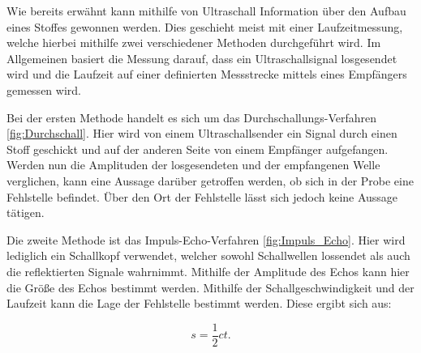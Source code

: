 Wie bereits erwähnt kann mithilfe von Ultraschall Information über
den Aufbau eines Stoffes gewonnen werden. Dies geschieht meist mit einer
Laufzeitmessung, welche hierbei mithilfe zwei verschiedener Methoden durchgeführt
wird. Im Allgemeinen basiert die Messung darauf, dass ein Ultraschallsignal
losgesendet wird und die Laufzeit auf einer definierten Messstrecke mittels eines
Empfängers gemessen wird.

Bei der ersten Methode handelt es sich um das Durchschallungs-Verfahren
\ref{fig:Durchschall}. Hier
wird von einem Ultraschallsender ein Signal durch einen Stoff geschickt und auf
der anderen Seite von einem Empfänger aufgefangen. Werden nun die Amplituden der
losgesendeten und der empfangenen Welle verglichen, kann eine Aussage darüber
getroffen werden, ob sich in der Probe eine Fehlstelle befindet. Über den Ort der
Fehlstelle lässt sich jedoch keine Aussage tätigen.

Die zweite Methode ist das Impuls-Echo-Verfahren \ref{fig:Impuls_Echo}.
Hier wird lediglich ein Schallkopf
verwendet, welcher sowohl Schallwellen lossendet als auch die reflektierten Signale
wahrnimmt. Mithilfe der Amplitude des Echos kann hier die Größe des Echos bestimmt
werden. Mithilfe der Schallgeschwindigkeit und der Laufzeit kann
die Lage der Fehlstelle bestimmt werden. Diese ergibt sich aus:

\begin{equation}
  s = \frac{1}{2} c t.
  \label{eqn:Fehlstelle}
\end{equation}

